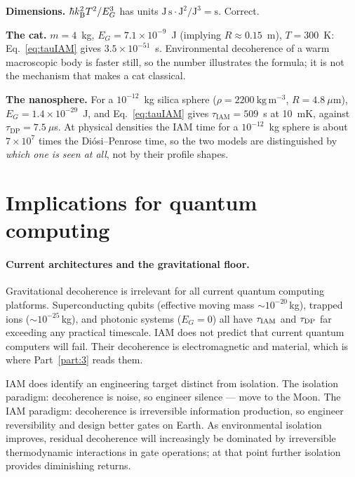 \begin{checkbox}[title={Independent check: the numbers}]
\textbf{Dimensions.} $\hbar k_{\mathrm B}^2T^2/E_G^3$ has units $\mathrm{J\,s}\cdot\mathrm{J}^2/\mathrm{J}^3=\mathrm s$.
Correct.

\textbf{The cat.} $m=4$~kg, $E_G=7.1\times10^{-9}$~J (implying $R\approx0.15$~m), $T=300$~K:
Eq.~\eqref{eq:tauIAM} gives $3.5\times10^{-51}$~s. \calc{} Environmental decoherence of a warm macroscopic body is faster still, so the number illustrates the formula; it is not the
mechanism that makes a cat classical.

\textbf{The nanosphere.} For a $10^{-12}$~kg silica sphere ($\rho=2200\ \mathrm{kg\,m^{-3}}$,
$R=4.8\ \mu$m), $E_G=1.4\times10^{-29}$~J, and Eq.~\eqref{eq:tauIAM} gives $\tau_{\mathrm{IAM}}=509$~s
at 10~mK, against $\tau_{\mathrm{DP}}=7.5\ \mu$s. \calc{} At physical densities the IAM time for a
$10^{-12}$~kg sphere is about $7\times10^{7}$ times the Di\'osi--Penrose time, so the two models are
distinguished by \emph{which one is seen at all}, not by their profile shapes.
\end{checkbox}

\section{Implications for quantum computing}\label{sec:gd_qc}
\paragraph{Current architectures and the gravitational floor.} Gravitational decoherence is irrelevant for all current quantum computing platforms.
Superconducting qubits (effective moving mass $\sim10^{-20}$\,kg), trapped ions ($\sim10^{-25}$\,kg), and photonic systems ($E_G=0$) all have $\tau_{\rm IAM}$
and $\tau_{\rm DP}$ far exceeding any practical timescale. \calc{} IAM does not predict that current quantum computers will fail. Their decoherence is
electromagnetic and material, which is where Part~\ref{part:3} reads them.

IAM does identify an engineering target distinct from isolation. The isolation paradigm: decoherence is noise, so engineer silence --- move to the Moon. The
IAM paradigm: decoherence is irreversible information production, so engineer reversibility and design better gates on Earth. As environmental isolation
improves, residual decoherence will increasingly be dominated by irreversible thermodynamic interactions in gate operations; at that point further
isolation provides diminishing returns. \interp

